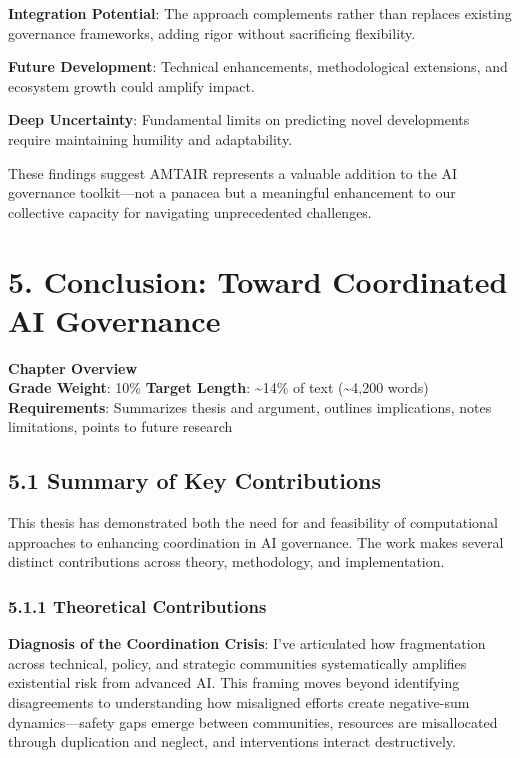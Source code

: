 \documentclass[
  11pt,
  letterpaper,
]{book}
\begin{document}
\textbf{Integration Potential}: The approach complements rather than
replaces existing governance frameworks, adding rigor without
sacrificing flexibility.

\textbf{Future Development}: Technical enhancements, methodological
extensions, and ecosystem growth could amplify impact.

\textbf{Deep Uncertainty}: Fundamental limits on predicting novel
developments require maintaining humility and adaptability.

These findings suggest AMTAIR represents a valuable addition to the AI
governance toolkit---not a panacea but a meaningful enhancement to our
collective capacity for navigating unprecedented challenges.


\chapter{5. Conclusion: Toward Coordinated AI
Governance}\label{sec-conclusion}

\textbf{Chapter Overview}\\
\textbf{Grade Weight}: 10\% \textbar{} \textbf{Target Length}:
\textasciitilde14\% of text (\textasciitilde4,200 words)\\
\textbf{Requirements}: Summarizes thesis and argument, outlines
implications, notes limitations, points to future research

\section{5.1 Summary of Key Contributions}\label{sec-key-contributions}

This thesis has demonstrated both the need for and feasibility of
computational approaches to enhancing coordination in AI governance. The
work makes several distinct contributions across theory, methodology,
and implementation.

\subsection{5.1.1 Theoretical
Contributions}\label{sec-theoretical-contributions}

\textbf{Diagnosis of the Coordination Crisis}: I've articulated how
fragmentation across technical, policy, and strategic communities
systematically amplifies existential risk from advanced AI. This framing
moves beyond identifying disagreements to understanding how misaligned
efforts create negative-sum dynamics---safety gaps emerge between
communities, resources are misallocated through duplication and neglect,
and interventions interact destructively.
\end{document}
